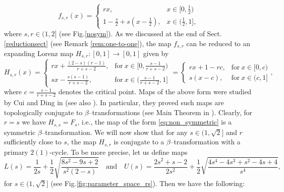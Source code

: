 \documentclass[10pt,reqno]{amsart}
\theoremstyle{plain}
\theoremstyle{assumption}
\theoremstyle{notation}
\theoremstyle{claim}
\theoremstyle{conj}
\theoremstyle{theorem}
\theoremstyle{proposition}
\theoremstyle{corollary}
\begin{document}
 \begin{equation*}
f_{s,r}(x)=\begin{cases}
			rx, & \text{$x\in[0,\frac{1}{2})$}\\
            1-\frac{s}{2}+s(x-\frac{1}{2}), & \text{$x\in(\frac{1}{2},1]$},
		 \end{cases}
\end{equation*}
where $s,r\in(1,2]$ (see Fig.\ref{nosym}). As we discussed at the end of Sect.\ref{reductionsect} (see Remark \ref{rem:one-to-one}), the map $f_{s,r}$ can be reduced to an expanding Lorenz map $H_{s,r}\colon[0,1]\to[0,1]$ given by
\begin{equation}
\label{eq:non_symmetric}
H_{s,r}(x)=
\begin{cases}
			rx+\frac{(2-s)(r-1)}{r+s-2}, & \text{for}\ x\in[0,\frac{s-1}{r+s-2})\\
            sx-\frac{s(s-1)}{r+s-2}, & \text{for}\ x\in(\frac{s-1}{r+s-2},1]
		 \end{cases}
=
\begin{cases}
			rx+1-rc, & \text{for}\ x\in[0,c)\\
            s(x-c), & \text{for}\ x\in(c,1]
		 \end{cases},
\end{equation}
where $c=\frac{s-1}{r+s-2}$ denotes the critical point. Maps of the above form were studied by Cui and Ding in \cite{DiCui} (see also \cite{DC}). In particular, they proved such maps are topologically conjugate to $\beta$--transformations (see Main Theorem in \cite{DiCui}). Clearly, for $r=s$ we have  $H_{s,s}=F_s$, i.e., the map of the form \eqref{eq:non_symmetric} is a symmetric $\beta$--transformation. We will now show that for any $s\in(1,\sqrt{2}]$ and $r$ sufficiently close to $s$, the map $H_{s,r}$ is conjugate to a $\beta$--transformation with a primary $2(1)$-cycle. To be more precise, let us define maps
$$
L(s)=\frac{1}{2s}+\frac{1}{2}\sqrt{\frac{8s^2-9s+2}{s^2(2-s)}}\quad\text{and}\quad U(s)=\frac{2s^2+s-2}{2s^2}+\frac{1}{2}\sqrt{\frac{4s^4-4s^3+s^2-4s+4}{s^4}},
$$
for $s\in(1,\sqrt{2}]$ (see Fig.\ref{fig:parameter_space_rs}). Then we have the following:
\end{document}
